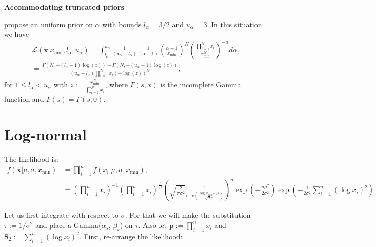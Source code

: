 \documentclass[a4paper, notitlepage, 10pt]{article}
\begin{document}
\textbf{Accommodating truncated priors}

\cite{Gillespie2017} propose an uniform prior on $\alpha$ with bounds $l_\alpha = 3/2$ and $u_\alpha = 3$.
In this situation we have
\begin{align} 
 \label{eq:truncated_alpha_MaL}
  & \mathcal{L}( \boldsymbol x |  x_{\min},  l_\alpha, u_\alpha) = \int_{l_\alpha}^{u_\alpha} \frac{1}{(u_\alpha - l_\alpha)} \frac{1}{(\alpha - 1)} \left( \frac{\alpha - 1}{x_{\min} } \right)^N \left(\frac{ \prod_{i= 1}^N x_i}{ x_{\min}^N }\right)^{-\alpha} d\alpha, \\ %
  &= \frac{\Gamma\left(N, -(l_\alpha - 1)\log(z) \right) - \Gamma\left(N, - (u_\alpha - 1) \log(z) \right) }{(u_\alpha - l_\alpha)\prod_{i= 1}^N x_i\left(-\log(z)\right)^N} , 
  \end{align}
for $ 1 \leq l_\alpha < u_\alpha$ with $z := \frac{x_{\min}^N}{\prod_{i= 1}^N x_i }$, where $\Gamma(s, x)$ is the incomplete Gamma function and $\Gamma(s) = \Gamma(s, 0)$.
\section{Log-normal}

The likelihood is:
\begin{align}
 f(\boldsymbol x | \mu, \sigma, x_{\min}) &= \prod_{i = 1}^n f(x_i | \mu, \sigma, x_{\min}), \\
 &= \left(\prod_{i = 1}^n x_i \right)^{-1} \left(\prod_{i = 1}^n x_i \right)^{\frac{\mu}{\sigma^2}} \left( \sqrt{\frac{2}{\pi\sigma^2}} \frac{1}{\text{erfc}\left( \frac{\log x_{\min} - \mu}{\sqrt{2}\sigma} \right)}\right)^n \exp\left( -\frac{n\mu^2}{2\sigma^2} \right) \exp\left(-\frac{1}{2\sigma^2}\sum_{i=1}^n (\log x_i)^2\right) 
\end{align}

Let us first integrate with respect to $\sigma$.
For that we will make the substitution $\tau := 1/\sigma^2$ and place a Gamma($\alpha_s$, $\beta_s$) on $\tau$.
Also let $ \boldsymbol p := \prod_{i = 1}^n x_i$ and $\boldsymbol S_2 := \sum_{i=1}^n (\log x_i)^2$.
First, re-arrange the likelihood:
\end{document}
